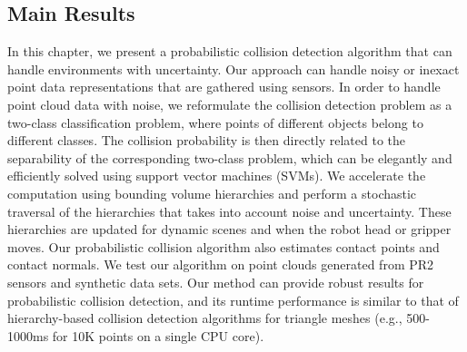 \subsection{Main Results}
In this chapter, we present a probabilistic collision detection algorithm that can handle environments with uncertainty.
Our approach can handle noisy or inexact point data representations that are gathered using sensors.
In order to handle point cloud data with noise, we reformulate the collision detection problem as a two-class classification problem,
where points of different objects belong to different classes. The collision probability is then directly related to the separability of the corresponding
two-class problem, which can be elegantly and efficiently solved using support vector machines (SVMs).
We accelerate the computation using bounding volume hierarchies and perform a stochastic traversal of the hierarchies that takes into account noise and
uncertainty. These hierarchies are updated for dynamic scenes and when the robot head or gripper moves.
Our probabilistic collision algorithm also estimates contact points and contact normals.
We test our algorithm on point clouds generated from PR2 sensors and synthetic data sets. Our method can provide robust results for probabilistic collision detection, and its runtime performance is similar to that of hierarchy-based collision detection algorithms for triangle meshes (e.g., 500-1000ms for 10K points on a single CPU core).



